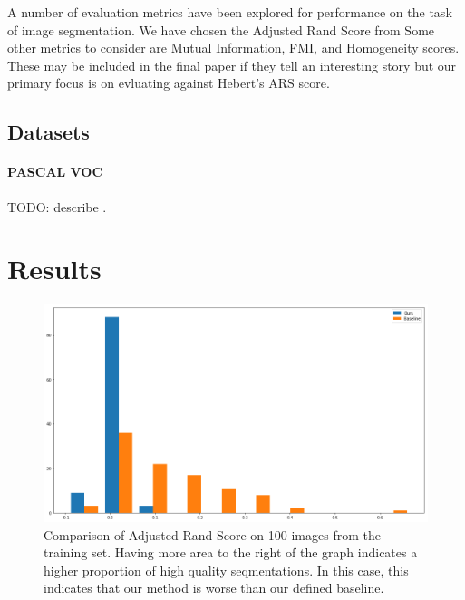 \documentclass[twocolumn]{article}
\newcommand{\todo}[1]{}
\renewcommand{\todo}[1]{{\color{red} TODO: {#1}}}
\newcommand{\seclab}[1]{\label{sec:#1}}
\newcommand{\figlab}[1]{\label{fig:#1}}
\begin{document}
A number of evaluation metrics have been explored for performance on the task of
image segmentation. We have chosen the Adjusted Rand Score from
\cite{unnikrishnan2005measure}  Some other metrics to consider are Mutual
Information, FMI, and Homogeneity scores. These may be included in the final
paper if they tell an interesting story but our primary focus is on
evluating against Hebert's ARS score.

\subsection{Datasets}\seclab{data}

\paragraph{PASCAL VOC} \todo{describe} \cite{Everingham10}.

\section{Results}\seclab{results}

\begin{figure}
  \centering

  \includegraphics[width=\linewidth]{figs/bars.png}

  \caption{Comparison of Adjusted Rand Score on 100 images from the training set. Having more area to the right of the graph
indicates a higher proportion of high quality seqmentations. In this case, this indicates that our method is worse than our
defined baseline.
  }
  \figlab{bars}

\end{figure}
\end{document}
